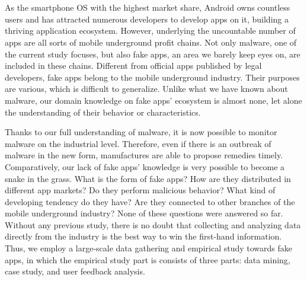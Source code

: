 \newpage


\chapter*{}
\vspace{-5mm}

As the smartphone OS with the highest market share, Android owns countless users and has attracted numerous developers to develop apps on it, building a thriving application ecosystem.
However, underlying the uncountable number of apps are all sorts of mobile underground profit chains.
Not only malware, one of the current study focuses, but also fake apps, an area we barely keep eyes on, are included in these chains.
Different from official apps published by legal developers, fake apps belong to the mobile underground industry.
Their purposes are various, which is difficult to generalize.
Unlike what we have known about malware, our domain knowledge on fake apps' ecosystem is almost none, let alone the understanding of their behavior or characteristics.

Thanks to our full understanding of malware, it is now possible to monitor malware on the industrial level.
Therefore, even if there is an outbreak of malware in the new form, manufactures are able to propose remedies timely.
Comparatively, our lack of fake apps' knowledge is very possible to become a snake in the grass.
What is the form of fake apps? How are they distributed in different app markets? Do they perform malicious behavior? What kind of developing tendency do they have? Are they connected to other branches of the mobile underground industry?
None of these questions were answered so far.
Without any previous study, there is no doubt that collecting and analyzing data directly from the industry is the best way to win the first-hand information.
Thus, we employ a large-scale data gathering and empirical study towards fake apps, in which the empirical study part is consists of three parts: data mining, case study, and user feedback analysis.

